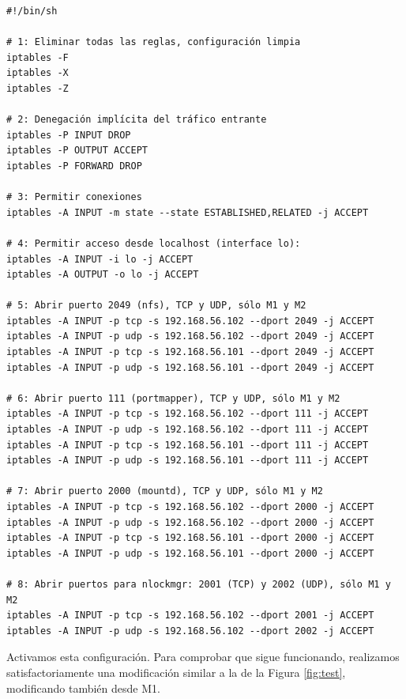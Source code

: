 \documentclass{article}
\begin{document}
\begin{Verbatim}
#!/bin/sh

# 1: Eliminar todas las reglas, configuración limpia
iptables -F
iptables -X
iptables -Z

# 2: Denegación implícita del tráfico entrante
iptables -P INPUT DROP
iptables -P OUTPUT ACCEPT
iptables -P FORWARD DROP

# 3: Permitir conexiones
iptables -A INPUT -m state --state ESTABLISHED,RELATED -j ACCEPT

# 4: Permitir acceso desde localhost (interface lo):
iptables -A INPUT -i lo -j ACCEPT
iptables -A OUTPUT -o lo -j ACCEPT

# 5: Abrir puerto 2049 (nfs), TCP y UDP, sólo M1 y M2
iptables -A INPUT -p tcp -s 192.168.56.102 --dport 2049 -j ACCEPT
iptables -A INPUT -p udp -s 192.168.56.102 --dport 2049 -j ACCEPT
iptables -A INPUT -p tcp -s 192.168.56.101 --dport 2049 -j ACCEPT
iptables -A INPUT -p udp -s 192.168.56.101 --dport 2049 -j ACCEPT

# 6: Abrir puerto 111 (portmapper), TCP y UDP, sólo M1 y M2
iptables -A INPUT -p tcp -s 192.168.56.102 --dport 111 -j ACCEPT
iptables -A INPUT -p udp -s 192.168.56.102 --dport 111 -j ACCEPT
iptables -A INPUT -p tcp -s 192.168.56.101 --dport 111 -j ACCEPT
iptables -A INPUT -p udp -s 192.168.56.101 --dport 111 -j ACCEPT

# 7: Abrir puerto 2000 (mountd), TCP y UDP, sólo M1 y M2
iptables -A INPUT -p tcp -s 192.168.56.102 --dport 2000 -j ACCEPT
iptables -A INPUT -p udp -s 192.168.56.102 --dport 2000 -j ACCEPT
iptables -A INPUT -p tcp -s 192.168.56.101 --dport 2000 -j ACCEPT
iptables -A INPUT -p udp -s 192.168.56.101 --dport 2000 -j ACCEPT

# 8: Abrir puertos para nlockmgr: 2001 (TCP) y 2002 (UDP), sólo M1 y M2
iptables -A INPUT -p tcp -s 192.168.56.102 --dport 2001 -j ACCEPT
iptables -A INPUT -p udp -s 192.168.56.102 --dport 2002 -j ACCEPT
\end{Verbatim}

Activamos esta configuración. Para comprobar que sigue funcionando, realizamos satisfactoriamente una modificación similar a la de la Figura \ref{fig:test},
modificando también desde M1.
\end{document}
